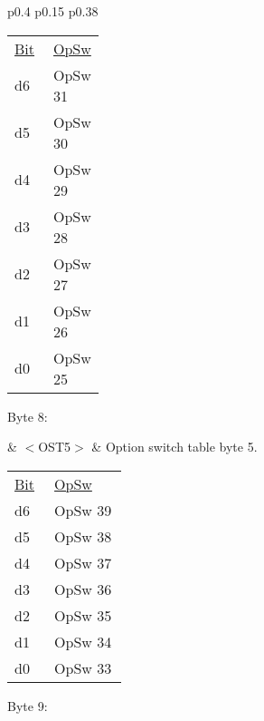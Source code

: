 \begin{tabular}{p{0.4\linewidth} p{0.15\linewidth} p{0.38\linewidth}} 

\begin{tabular}{|p{0.3cm}|p{0.3cm}|p{0.3cm}|p{0.3cm}|p{0.3cm}|p{0.3cm}|p{0.3cm}|p{0.3cm}|}
\hline
0 & d6 & d5 & d4 & d3 & d2 & d1 & d0\\
\hline
\end{tabular}
& $<$OST4$>$ & Option switch table byte 4.\\
\end{tabular}

\begin{tabular}{p{0.05\linewidth} p{0.2\linewidth} } 
\underline{Bit} & \underline{OpSw} \\
d6 & OpSw 31\\
d5 & OpSw 30\\
d4 & OpSw 29\\
d3 & OpSw 28\\
d2 & OpSw 27\\
d1 & OpSw 26\\
d0 & OpSw 25\\
\end{tabular}

Byte 8:

& $<$OST5$>$ & Option switch table byte 5.\\
\end{tabular}

\begin{tabular}{p{0.05\linewidth} p{0.2\linewidth} } 
\underline{Bit} & \underline{OpSw} \\
d6 & OpSw 39\\
d5 & OpSw 38\\
d4 & OpSw 37\\
d3 & OpSw 36\\
d2 & OpSw 35\\
d1 & OpSw 34\\
d0 & OpSw 33\\
\end{tabular}

Byte 9:


